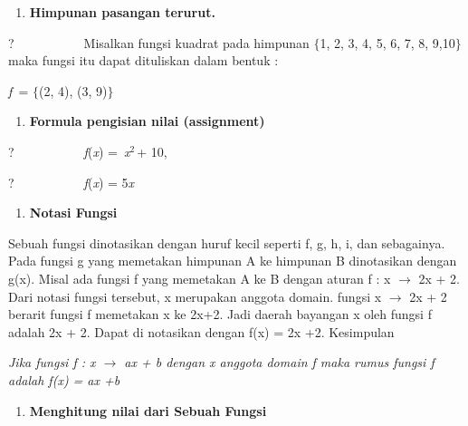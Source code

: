 \documentclass[11pt,fleqn]{book} %
\begin{document}
\noindent \textbf{}

\begin{enumerate}
\item \textbf{ Himpunan pasangan terurut.}
\end{enumerate}

\noindent 

\noindent ?~~~~~~~~~~~Misalkan fungsi kuadrat pada himpunan $\{$1, 2, 3, 4, 5, 6, 7, 8, 9,10$\}$ maka fungsi itu dapat dituliskan dalam bentuk :

\noindent \textit{f~}= $\{$(2, 4), (3, 9)$\}$

\noindent 

\begin{enumerate}
\item  \textbf{Formula pengisian nilai (assignment)}
\end{enumerate}

\noindent \textbf{}

\noindent ?~~~~~~~~~~~\textit{f}(\textit{x}) =~\textit{x}${}^{2~}$+ 10,

\noindent 

\noindent ?~~~~~~~~~~~\textit{f}(\textit{x}) = 5\textit{x}

\noindent \textit{}

\begin{enumerate}
\item \textit{ }\textbf{ Notasi Fungsi}
\end{enumerate}

\noindent 

\noindent Sebuah fungsi dinotasikan dengan huruf kecil seperti f, g, h, i, dan sebagainya. Pada fungsi g yang memetakan himpunan A ke himpunan B dinotasikan dengan g(x). Misal ada fungsi f yang memetakan A ke B dengan aturan f : x $\mathrm{\to}$ 2x + 2. Dari notasi fungsi tersebut, x merupakan anggota domain. fungsi x $\mathrm{\to}$ 2x + 2 berarit fungsi f memetakan x ke 2x+2. Jadi daerah bayangan x oleh fungsi f adalah 2x + 2. Dapat di notasikan dengan f(x) = 2x +2. Kesimpulan

\noindent 

\noindent \textit{Jika fungsi f : x $\to$ ax + b dengan x anggota domain f maka rumus fungsi f adalah f(x) = ax +b}

\noindent \textit{}

\begin{enumerate}
\item \textit{ }\textbf{Menghitung nilai dari Sebuah Fungsi}
\end{enumerate}
\end{document}
